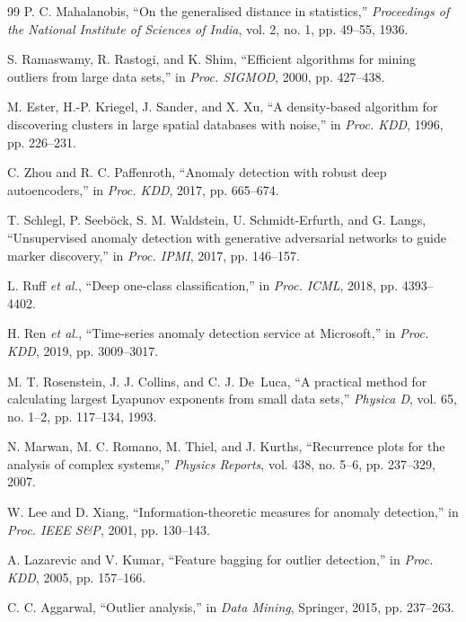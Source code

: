 \documentclass[journal]{IEEEtran}
\newcommand{\etal}{\textit{et al.}}
\begin{document}
\begin{thebibliography}{99}
P. C. Mahalanobis, ``On the generalised distance in statistics,'' \textit{Proceedings of the National Institute of Sciences of India}, vol. 2, no. 1, pp. 49--55, 1936.

S. Ramaswamy, R. Rastogi, and K. Shim, ``Efficient algorithms for mining outliers from large data sets,'' in \textit{Proc. SIGMOD}, 2000, pp. 427--438.

M. Ester, H.-P. Kriegel, J. Sander, and X. Xu, ``A density-based algorithm for discovering clusters in large spatial databases with noise,'' in \textit{Proc. KDD}, 1996, pp. 226--231.

C. Zhou and R. C. Paffenroth, ``Anomaly detection with robust deep autoencoders,'' in \textit{Proc. KDD}, 2017, pp. 665--674.

T. Schlegl, P. Seeb{\"o}ck, S. M. Waldstein, U. Schmidt-Erfurth, and G. Langs, ``Unsupervised anomaly detection with generative adversarial networks to guide marker discovery,'' in \textit{Proc. IPMI}, 2017, pp. 146--157.

L. Ruff \etal, ``Deep one-class classification,'' in \textit{Proc. ICML}, 2018, pp. 4393--4402.

H. Ren \etal, ``Time-series anomaly detection service at Microsoft,'' in \textit{Proc. KDD}, 2019, pp. 3009--3017.

M. T. Rosenstein, J. J. Collins, and C. J. De~Luca, ``A practical method for calculating largest Lyapunov exponents from small data sets,'' \textit{Physica D}, vol. 65, no. 1--2, pp. 117--134, 1993.

N. Marwan, M. C. Romano, M. Thiel, and J. Kurths, ``Recurrence plots for the analysis of complex systems,'' \textit{Physics Reports}, vol. 438, no. 5--6, pp. 237--329, 2007.

W. Lee and D. Xiang, ``Information-theoretic measures for anomaly detection,'' in \textit{Proc. IEEE S\&P}, 2001, pp. 130--143.

A. Lazarevic and V. Kumar, ``Feature bagging for outlier detection,'' in \textit{Proc. KDD}, 2005, pp. 157--166.

C. C. Aggarwal, ``Outlier analysis,'' in \textit{Data Mining}, Springer, 2015, pp. 237--263.


\end{thebibliography}
\end{document}
